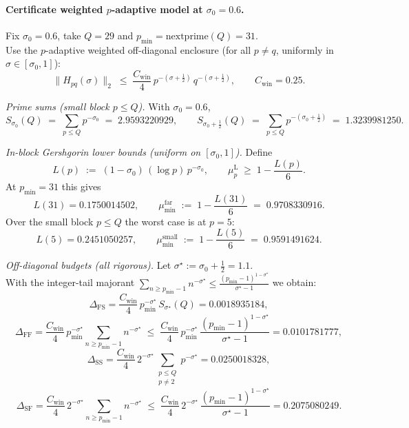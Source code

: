 \documentclass[11pt]{article}
\theoremstyle{definition}
\theoremstyle{remark}
\begin{document}
\paragraph*{Certificate \textemdash{} weighted \(p\)-adaptive model at \(\sigma_0=0.6\).}
Fix \(\sigma_0=0.6\), take \(Q=29\) and \(p_{\min}=\mathrm{nextprime}(Q)=31\).\\
Use the \(p\)-adaptive weighted off-diagonal enclosure (for all \(p\neq q\), uniformly in \(\sigma\in[\sigma_0,1]\)):
\[
\|H_{pq}(\sigma)\|_2 \;\le\; \frac{C_{\mathrm{win}}}{4}\, p^{-(\sigma+\tfrac12)}\, q^{-(\sigma+\tfrac12)},
\qquad C_{\mathrm{win}}=0.25.
\]

\noindent\emph{Prime sums (small block \(p\le Q\)).} With \(\sigma_0=0.6\),
\[
S_{\sigma_0}(Q)\;=\;\sum_{p\le Q} p^{-\sigma_0}\;=\;2.9593220929,\qquad
S_{\sigma_0+\tfrac12}(Q)\;=\;\sum_{p\le Q} p^{-(\sigma_0+\tfrac12)}\;=\;1.3239981250.
\]

\noindent\emph{In-block Gershgorin lower bounds (uniform on \([\sigma_0,1]\)).}
Define
\[
L(p)\;:=\;(1-\sigma_0)\,(\log p)\,p^{-\sigma_0},\qquad 
\mu_p^{\mathrm L}\;\ge\;1-\frac{L(p)}{6}.
\]
At \(p_{\min}=31\) this gives
\[
L(31)=0.1750014502,\qquad 
\mu_{\min}^{\mathrm{far}}\;:=\;1-\frac{L(31)}{6}\;=\;0.9708330916.
\]
Over the small block \(p\le Q\) the worst case is at \(p=5\):
\[
L(5)=0.2451050257,\qquad 
\mu_{\min}^{\mathrm{small}}\;:=\;1-\frac{L(5)}{6}\;=\;0.9591491624.
\]

\noindent\emph{Off-diagonal budgets (all rigorous).}
Let \(\sigma^\star:=\sigma_0+\tfrac12=1.1\).\\
With the integer-tail majorant \(\displaystyle \sum_{n\ge p_{\min}-1} n^{-\sigma^\star}\le
\frac{(p_{\min}-1)^{1-\sigma^\star}}{\sigma^\star-1}\)
we obtain:
\[
\Delta_{\mathrm{FS}}
=\frac{C_{\mathrm{win}}}{4}\,p_{\min}^{-\sigma^\star}\,S_{\sigma^\star}(Q)
=0.0018935184,
\]
\[
\Delta_{\mathrm{FF}}
=\frac{C_{\mathrm{win}}}{4}\,p_{\min}^{-\sigma^\star}\!
\sum_{n\ge p_{\min}-1}\! n^{-\sigma^\star}
\;\le\;\frac{C_{\mathrm{win}}}{4}\,p_{\min}^{-\sigma^\star}\,
\frac{(p_{\min}-1)^{1-\sigma^\star}}{\sigma^\star-1}
=0.0101781777,
\]
\[
\Delta_{\mathrm{SS}}
=\frac{C_{\mathrm{win}}}{4}\,2^{-\sigma^\star}
\!\sum_{\substack{p\le Q\\ p\neq 2}}\! p^{-\sigma^\star}
=0.0250018328,
\]
\[
\Delta_{\mathrm{SF}}
=\frac{C_{\mathrm{win}}}{4}\,2^{-\sigma^\star}\!
\sum_{n\ge p_{\min}-1}\! n^{-\sigma^\star}
\;\le\;\frac{C_{\mathrm{win}}}{4}\,2^{-\sigma^\star}\,
\frac{(p_{\min}-1)^{1-\sigma^\star}}{\sigma^\star-1}
=0.2075080249.
\]
\end{document}
